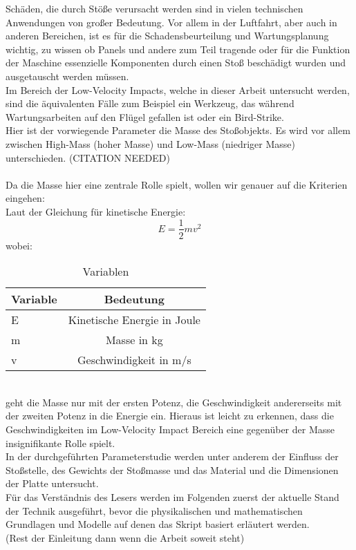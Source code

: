 Schäden, die durch Stöße verursacht werden sind in vielen technischen
Anwendungen von großer Bedeutung. Vor allem in der Luftfahrt, aber auch in
anderen Bereichen, ist es für die Schadensbeurteilung und Wartungsplanung
wichtig, zu wissen ob Panels und andere zum Teil tragende oder für die Funktion
der Maschine essenzielle Komponenten durch einen Stoß beschädigt wurden und
ausgetauscht werden müssen. \\
Im Bereich der Low-Velocity Impacts, welche in dieser Arbeit untersucht werden,
sind die äquivalenten Fälle zum Beispiel ein Werkzeug, das während
Wartungsarbeiten auf den Flügel gefallen ist oder ein Bird-Strike. \\
Hier ist der vorwiegende Parameter die Masse des Stoßobjekts. Es wird vor allem
zwischen High-Mass (hoher Masse) und Low-Mass (niedriger Masse) unterschieden.
(CITATION NEEDED)\\
\\
Da die Masse hier eine zentrale Rolle spielt, wollen wir genauer auf die
Kriterien eingehen: \\
Laut der Gleichung für kinetische Energie: 
\begin{equation}
E = \frac{1}{2}mv^2
\end{equation}
wobei: 
\begin{table}[h!]
	\begin{center}
		\caption{Variablen}
		\label{tab:Tabelle 1}
		\begin{tabular}{l|c}
			\textbf{Variable} & \textbf{Bedeutung}\\
			\hline
			E & Kinetische Energie in Joule\\
			m & Masse in kg\\
			v & Geschwindigkeit in m/s\\
		\end{tabular}
	\end{center}
\end{table}\\
geht die Masse nur mit der ersten Potenz, die Geschwindigkeit andererseits mit
der zweiten Potenz in die Energie ein. Hieraus ist leicht zu erkennen, dass die
Geschwindigkeiten im Low-Velocity Impact Bereich eine gegenüber der Masse
insignifikante Rolle spielt. \\
In der durchgeführten Parameterstudie werden unter anderem der Einfluss der
Stoßstelle, des Gewichts der Stoßmasse und das Material und die Dimensionen der
Platte untersucht. \\
Für das Verständnis des Lesers werden im Folgenden zuerst der aktuelle Stand der
Technik ausgeführt, bevor die physikalischen und mathematischen Grundlagen und
Modelle auf denen das Skript basiert erläutert werden.\\
(Rest der Einleitung dann wenn die Arbeit soweit steht)
\\
